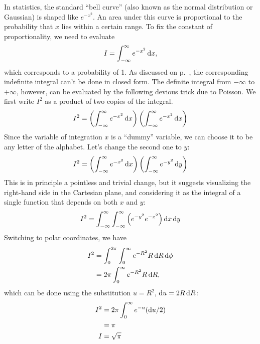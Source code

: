 
\begin{eg}\label{eg:poisson-trick}
In statistics, the standard ``bell curve'' (also known as the normal distribution or Gaussian)
is shaped like $e^{-x^2}$. An area under this curve is proportional to the probability that $x$
lies within a certain range. To fix the constant of proportionality, we need to evaluate
\begin{equation*}
  I = \int_{-\infty}^\infty e^{-x^2} \operatorname{d\!} x,
\end{equation*}
which corresponds to a probability of 1.
As discussed on p.~\pageref{impossible-integrals}, the corresponding indefinite integral can't be
done in closed form. The definite integral from $-\infty$ to $+\infty$, however, can be evaluated
by the following devious trick due to Poisson. We first write $I^2$ as a product of two copies
of the integral.
\begin{equation*}
  I^2 = \left(\int_{-\infty}^\infty e^{-x^2} \operatorname{d\!} x\right) \left(\int_{-\infty}^\infty e^{-x^2} \operatorname{d\!} x\right)
\end{equation*}
Since the variable of integration $x$ is a ``dummy'' variable, we can choose it to be any letter of the
alphabet. Let's change the second one to $y$:
\begin{equation*}
  I^2 = \left(\int_{-\infty}^\infty e^{-x^2} \operatorname{d\!} x\right) \left(\int_{-\infty}^\infty e^{-y^2} \operatorname{d\!} y\right)
\end{equation*}
This is in principle a pointless and trivial change, but it suggests visualizing the right-hand side in
the Cartesian plane, and considering it as the integral of a single function that depends on both $x$ and $y$:
\begin{align*}
  I^2 = \int_{-\infty}^\infty  \int_{-\infty}^\infty \left( e^{-y^2}e^{-x^2}\right) \operatorname{d\!} x \operatorname{d\!} y
\end{align*}
Switching to polar coordinates, we have
\begin{align*}
  I^2 &=  \int_0^{2\pi} \int_0^\infty e^{-R^2} R \operatorname{d\!} R \operatorname{d\!} \phi \\
      &=  2\pi \int_0^\infty e^{-R^2} R \operatorname{d\!} R,
\end{align*}
which can be done using the substitution $u=R^2$, $\operatorname{d\!} u=2R \operatorname{d\!} R$:
\begin{align*}
  I^2 &=  2\pi \int_0^\infty e^{-u} (\operatorname{d\!} u/2) \\
      &= \pi \\
  I &= \sqrt{\pi}
\end{align*}
\end{eg}

